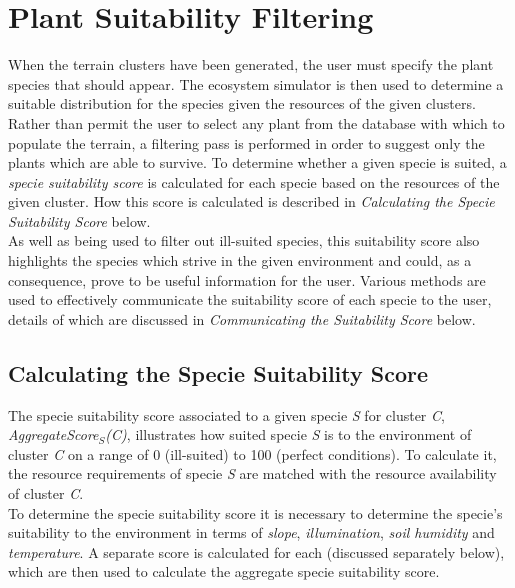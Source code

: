 \section{Plant Suitability Filtering}

When the terrain clusters have been generated, the user must specify the plant species that should appear. The ecosystem simulator is then used to determine a suitable distribution for the species given the resources of the given clusters.\\

Rather than permit the user to select any plant from the database with which to populate the terrain, a filtering pass is performed in order to suggest only the plants which are able to survive. To determine whether a given specie is suited, a \textit{specie suitability score} is calculated for each specie based on the resources of the given cluster. How this score is calculated is described in \textit{Calculating the Specie Suitability Score} below.\\

As well as being used to filter out ill-suited species, this suitability score also highlights the species which strive in the given environment and could, as a consequence, prove to be useful information for the user. Various methods are used to effectively communicate the suitability score of each specie to the user, details of which are discussed in \textit{Communicating the Suitability Score} below.

\subsection{Calculating the Specie Suitability Score}

The specie suitability score associated to a given specie \textit{S} for cluster \textit{C}, \textit{AggregateScore$_{S}$(C)}, illustrates how suited specie \textit{S} is to the environment of cluster \textit{C} on a range of 0 (ill-suited) to 100 (perfect conditions). To calculate it, the resource requirements of specie \textit{S} are matched with the resource availability of cluster \textit{C}.\\

To determine the specie suitability score it is necessary to determine the specie's suitability to the environment in terms of \textit{slope}, \textit{illumination}, \textit{soil humidity} and \textit{temperature}. A separate score is calculated for each (discussed separately below), which are then used to calculate the aggregate specie suitability score. 

